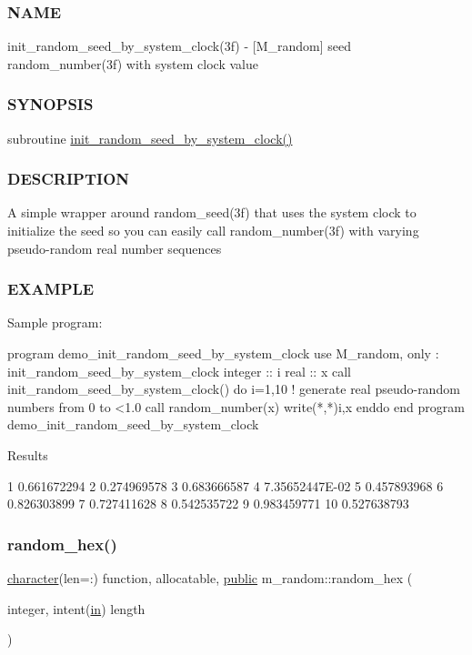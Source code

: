 \subsubsection*{N\+A\+ME}

init\+\_\+random\+\_\+seed\+\_\+by\+\_\+system\+\_\+clock(3f) -\/ \mbox{[}M\+\_\+random\mbox{]} seed random\+\_\+number(3f) with system clock value \subsubsection*{S\+Y\+N\+O\+P\+S\+IS}

subroutine \hyperlink{namespacem__random_a887216bea7a75b314e538afd3ebe2ff3}{init\+\_\+random\+\_\+seed\+\_\+by\+\_\+system\+\_\+clock()} \subsubsection*{D\+E\+S\+C\+R\+I\+P\+T\+I\+ON}

A simple wrapper around random\+\_\+seed(3f) that uses the system clock to initialize the seed so you can easily call random\+\_\+number(3f) with varying pseudo-\/random real number sequences \subsubsection*{E\+X\+A\+M\+P\+LE}

\begin{DoxyVerb}Sample program:

 program demo_init_random_seed_by_system_clock
 use M_random, only : init_random_seed_by_system_clock
 integer :: i
 real    :: x
    call init_random_seed_by_system_clock()
    do i=1,10
       ! generate real pseudo-random numbers from 0 to <1.0
       call random_number(x)
       write(*,*)i,x
    enddo
 end program demo_init_random_seed_by_system_clock

Results

     1  0.661672294
     2  0.274969578
     3  0.683666587
     4   7.35652447E-02
     5  0.457893968
     6  0.826303899
     7  0.727411628
     8  0.542535722
     9  0.983459771
    10  0.527638793 \end{DoxyVerb}
 \mbox{\label{namespacem__random_a2fa2c1b1bcef16ff3be995981738cec0}} 
\subsubsection{\texorpdfstring{random\+\_\+hex()}{random\_hex()}}
{\footnotesize\ttfamily \hyperlink{option__stopwatch_83_8txt_abd4b21fbbd175834027b5224bfe97e66}{character}(len=\+:) function, allocatable, \hyperlink{M__stopwatch_83_8txt_a2f74811300c361e53b430611a7d1769f}{public} m\+\_\+random\+::random\+\_\+hex (\begin{DoxyParamCaption}\item[{integer, intent(\hyperlink{M__journal_83_8txt_afce72651d1eed785a2132bee863b2f38}{in})}]{length }\end{DoxyParamCaption})}



